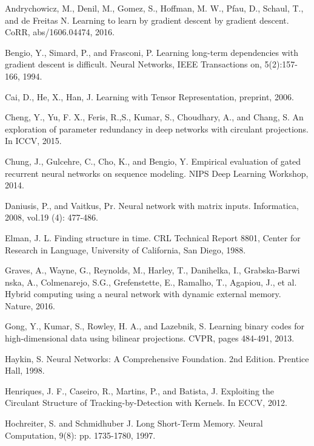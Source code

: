 \documentclass[a4paper,11pt]{article}
\begin{document}
\begin{thebibliography}{1}



 Andrychowicz, M.,  Denil, M., Gomez, S., Hoffman, M. W., Pfau, D., Schaul, T., and de Freitas N.  Learning to learn by gradient descent by gradient descent. CoRR, abs/1606.04474, 2016.

 Bengio,  Y.,  Simard,  P.,  and  Frasconi, P. Learning long-term dependencies with gradient descent is difficult. Neural Networks, IEEE Transactions on, 5(2):157-166, 1994.


 Cai, D., He, X., Han, J. Learning with Tensor Representation, preprint, 2006.

 Cheng, Y., Yu, F. X., Feris, R.,S., Kumar, S., Choudhary, A., and Chang, S.  An exploration of parameter redundancy in deep networks with circulant projections. In
ICCV, 2015.


 Chung, J., Gulcehre, C., Cho, K., and Bengio, Y. Empirical evaluation of gated recurrent neural networks on sequence modeling. NIPS Deep Learning Workshop, 2014.

 Daniusis, P., and Vaitkus, Pr. Neural network with matrix inputs. Informatica, 2008, vol.19 (4): 477-486.


 Elman, J. L. Finding structure in time.  CRL Technical Report 8801, Center for Research in Language, University
of California, San Diego, 1988.

  Graves, A., Wayne, G., Reynolds, M.,  Harley, T., Danihelka, I., Grabska-Barwi
 nska, A., Colmenarejo, S.G., Grefenstette, E., Ramalho, T., Agapiou, J., et al. Hybrid computing using a neural network with dynamic external memory. Nature, 2016.
 


  Gong, Y., Kumar, S., Rowley, H. A., and Lazebnik, S. Learning binary codes for high-dimensional data using bilinear projections. CVPR, pages 484-491, 2013.



 Haykin, S. Neural Networks: A Comprehensive Foundation. 2nd Edition. Prentice Hall, 1998.


 Henriques,  J. F.,  Caseiro, R.,  Martins, P.,  and Batista, J.   Exploiting the Circulant Structure of Tracking-by-Detection with Kernels.   In ECCV, 2012.


 Hochreiter, S.  and  Schmidhuber J. Long  Short-Term  Memory. Neural  Computation, 9(8): pp. 1735-1780, 1997.




\end{thebibliography}
\end{document}
